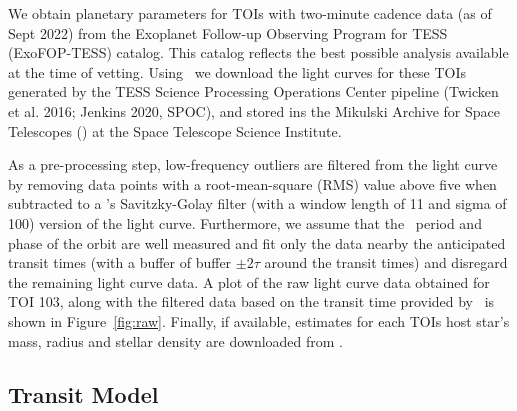 \documentclass[floatfix,ApJL,twocolumn]{aastex631}
\begin{document}
We obtain planetary parameters for \numTessCandidates TOIs with two-minute cadence data (as of Sept 2022) from the Exoplanet Follow-up Observing Program for TESS (ExoFOP-TESS) catalog.
This catalog reflects the best possible analysis available at the time of vetting.
Using \lightkurve\ we download the light curves for these TOIs generated by the TESS Science Processing Operations Center pipeline (Twicken et al. 2016; Jenkins 2020, SPOC), and stored ins the Mikulski Archive for Space Telescopes (\mast) at the Space Telescope Science Institute.

As a pre-processing step, low-frequency outliers are filtered from the light curve by removing data points with a root-mean-square (RMS) value above five when subtracted to a \scipy’s Savitzky-Golay filter (with a window length of 11 and sigma of 100) version of the light curve. 
Furthermore, we assume that the \exofop\ period and phase of the orbit are well measured and fit only the data nearby the anticipated transit times (with a buffer of buffer $\pm2\tau$ around the transit times) and disregard the remaining light curve data. 
A plot of the raw \mast light curve data obtained for {TOI 103}, along with the filtered data based on the transit time provided by \exofop\ is shown in Figure~\ref{fig:raw}.
Finally, if available, estimates for each TOIs host star's mass, radius and stellar density are downloaded from \mast. 



\subsection{Transit Model}
\end{document}
